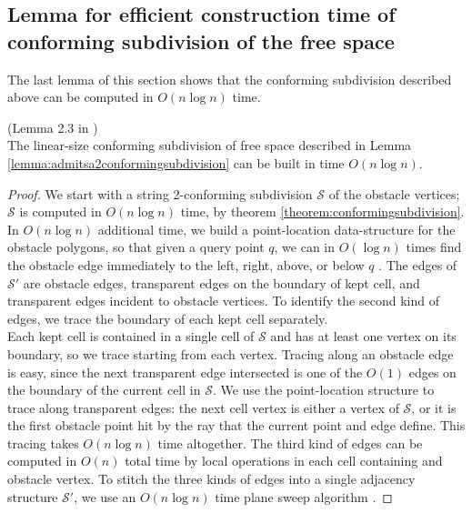 \subsection{Lemma for efficient construction time of conforming subdivision of the free space}

The last lemma of this section shows that the conforming subdivision described above can be computed in $O(n\log n)$ time.

\begin{Lemma} (Lemma 2.3 in \cite{HershbergerS99})\\
The linear-size conforming subdivision of free space described in Lemma \ref{lemma:admitsa2conformingsubdivision} can be built in time $O(n\log n)$.
\end{Lemma}

\begin{proof}
We start with a string 2-conforming subdivision $\mathcal{S}$ of the obstacle vertices; $\mathcal{S}$ is computed in $O(n\log n)$ time, by theorem \ref{theorem:conformingsubdivision}. In $O(n\log n)$ additional time, we build a point-location data-structure for the obstacle polygons, so that given a query point $q$, we can in $O(\log n)$ times find the obstacle edge immediately to the left, right, above, or below $q$ \cite{EdelsbrunnerGS86}\cite{Kirkpatrick83}. The edges of $\mathcal{S}'$ are obstacle edges, transparent edges on the boundary of kept cell, and transparent edges incident to obstacle vertices. To identify the second kind of edges, we trace the boundary of each kept cell separately. \\

Each kept cell is contained in a single cell of $\mathcal{S}$ and has at least one vertex on its boundary, so we trace starting from each vertex. Tracing along an obstacle edge is easy, since the next transparent edge intersected is one of the $O(1)$ edges on the boundary of the current cell in $\mathcal{S}$. We use the point-location structure to trace along transparent edges: the next cell vertex is either a vertex of $\mathcal{S}$, or it is the first obstacle point hit by the ray that the current point and edge define. This tracing takes $O(n\log n)$ time altogether. The third kind of edges can be computed in $O(n)$ total time by local operations in each cell containing and obstacle vertex. To stitch the three kinds of edges into a single adjacency structure $\mathcal{S}'$, we use an $O(n \log n)$ time plane sweep algorithm \cite{CompGeo}.
\end{proof}